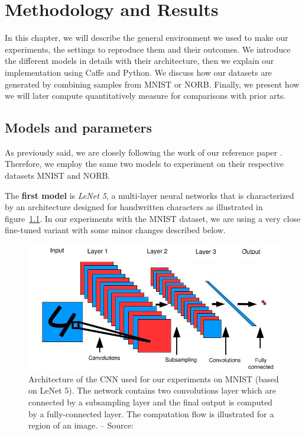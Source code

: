 \documentclass[a4paper,12pt]{report}
\begin{document}
\chapter{Methodology and Results}
\label{chap:results}

In this chapter, we will describe the general environment we used to make our experiments, the settings to reproduce them and their outcomes.
We introduce the different models in details with their architecture, then we explain our implementation using Caffe and Python.
We discuss how our datasets are generated by combining samples from MNIST or NORB.
Finally, we present how we will later compute quantitatively measure for comparisons with prior arts.

\section{Models and parameters}

As previously said, we are closely following the work of our reference paper \cite{hadsell2006dimensionality}.
Therefore, we employ the same two models to experiment on their respective datasets MNIST and NORB.

The {\bf first model} is {\em LeNet 5}, a multi-layer neural networks that is characterized by an architecture designed for handwritten characters as illustrated in figure~\ref{fig:siamese_cnn}.
In our experiments with the MNIST dataset, we are using a very close fine-tuned variant with some minor changes described below.

\begin{figure}[t]
    \begin{center}
        \includegraphics{thesis_figures/siamese_cnn.jpg}
    \end{center}
    \caption{Architecture of the CNN used for our experiments on MNIST (based on LeNet 5). The network contains two convolutions layer which are connected by a subsampling layer and the final output is computed by a fully-connected layer. The computation flow is illustrated for a region of an image. -- Source: \cite{hadsell2006dimensionality}}
    \label{fig:siamese_cnn}
\end{figure}
\end{document}
